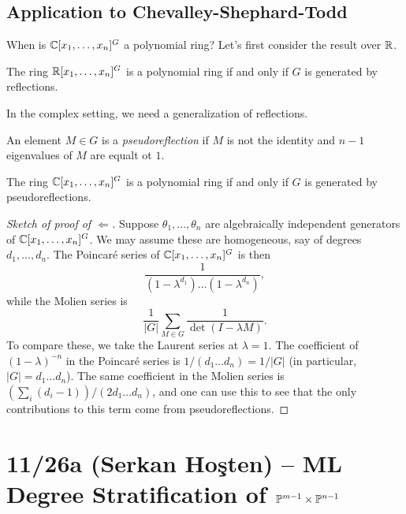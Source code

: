 \documentclass{amsart}
\begin{document}
\subsection{Application to Chevalley-Shephard-Todd}

When is $\mathbb{C}[x_1, \dots, x_n]^G$ a polynomial ring?
Let's first consider the result over $\mathbb{R}$.

\begin{thm}
	The ring $\mathbb{R}[x_1, \dots, x_n]^G$ is a polynomial ring if and only if $G$ is generated by reflections.
\end{thm}

In the complex setting, we need a generalization of reflections.

\begin{dfn}
	An element $M \in G$ is a \emph{pseudoreflection} if $M$ is not the identity and $n - 1$ eigenvalues of $M$ are equalt ot $1$.
\end{dfn}

\begin{thm}
	The ring $\mathbb{C}[x_1, \dots, x_n]^G$ is a polynomial ring if and only if $G$ is generated by pseudoreflections.
\end{thm}

\begin{proof}[Sketch of proof of $\Leftarrow$]
	Suppose $\theta_1, \dots, \theta_n$ are algebraically independent generators of $\mathbb{C}[x_1, \dots, x_n]^G$.
	We may assume these are homogeneous, say of degrees $d_1, \dots, d_n$.
	The Poincar\'e series of $\mathbb{C}[x_1, \dots, x_n]^G$ is then
	\[
		\frac{1}{(1 - \lambda^{d_1}) \dots (1 - \lambda^{d_n})},
	\]
	while the Molien series is
	\[
		\frac{1}{|G|} \sum_{M \in G} \frac{1}{\det(I - \lambda M)}.
	\]
	To compare these, we take the Laurent series at $\lambda = 1$.
	The coefficient of $(1 - \lambda)^{-n}$ in the Poincar\'e series is $1 / (d_1 \dots d_n) = 1 / |G|$ (in particular, $|G| = d_1 \dots d_n$).
	The same coefficient in the Molien series is $(\sum_i (d_i - 1)) / (2 d_1 \dots d_n)$, and one can use this to see that the only contributions to this term come from pseudoreflections.
\end{proof}

\section{11/26a (Serkan Ho\c{s}ten) -- ML Degree Stratification of $\mathbb{P}^{m-1} \times \mathbb{P}^{n-1}$}
\end{document}
